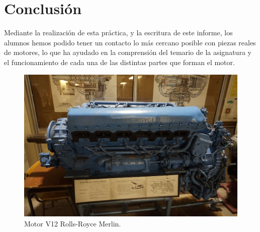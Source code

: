 

\newpage

\section{Conclusión} \label{s:conclusion}

Mediante la realización de esta práctica, y la escritura de este informe, los alumnos hemos podido tener un contacto lo más cercano posible con piezas reales de motores, lo que ha ayudado en la comprensión del temario de la asignatura y el funcionamiento de cada una de las distintas partes que forman el motor.


\begin{figure}[H]
	\centering
	\includegraphics[width=0.6\linewidth]{Figures/02/extra/merlin.jpg}
	\caption{Motor V12 Rolls-Royce Merlin.}
	\label{fig:merlin}
\end{figure}






